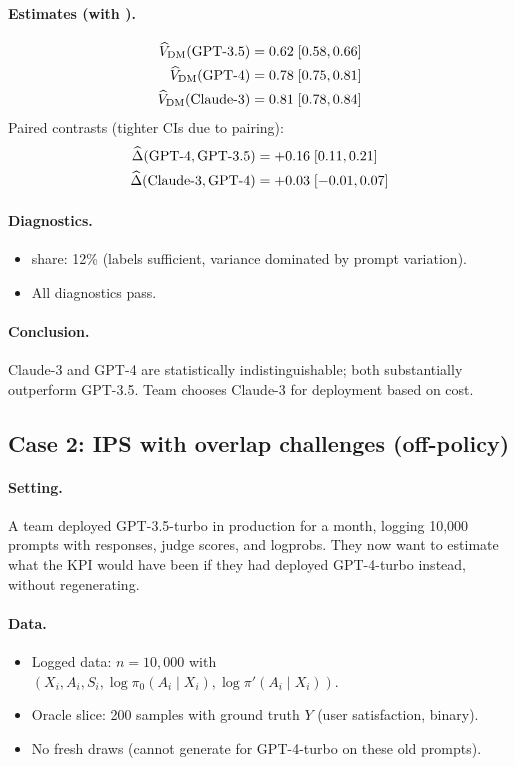 \paragraph{Estimates (with \oua).}
\begin{align*}
\widehat{V}_{\text{DM}}(\text{GPT-3.5}) &= 0.62 \; [0.58, 0.66] \\
\widehat{V}_{\text{DM}}(\text{GPT-4}) &= 0.78 \; [0.75, 0.81] \\
\widehat{V}_{\text{DM}}(\text{Claude-3}) &= 0.81 \; [0.78, 0.84]
\end{align*}
Paired contrasts (tighter CIs due to pairing):
\begin{align*}
\widehat{\Delta}(\text{GPT-4}, \text{GPT-3.5}) &= +0.16 \; [0.11, 0.21] \\
\widehat{\Delta}(\text{Claude-3}, \text{GPT-4}) &= +0.03 \; [-0.01, 0.07]
\end{align*}

\paragraph{Diagnostics.}
\begin{itemize}
\item \oua{} share: 12\% (labels sufficient, variance dominated by prompt variation).
\item All diagnostics pass.
\end{itemize}

\paragraph{Conclusion.} Claude-3 and GPT-4 are statistically indistinguishable; both substantially outperform GPT-3.5. Team chooses Claude-3 for deployment based on cost.

\subsection{Case 2: IPS with overlap challenges (off-policy)}

\paragraph{Setting.} A team deployed GPT-3.5-turbo in production for a month, logging 10,000 prompts with responses, judge scores, and logprobs. They now want to estimate what the KPI would have been if they had deployed GPT-4-turbo instead, without regenerating.

\paragraph{Data.}
\begin{itemize}
\item Logged data: $n = 10{,}000$ with $(X_i, A_i, S_i, \log \pi_0(A_i \mid X_i), \log \pi'(A_i \mid X_i))$.
\item Oracle slice: 200 samples with ground truth $Y$ (user satisfaction, binary).
\item No fresh draws (cannot generate for GPT-4-turbo on these old prompts).
\end{itemize}

